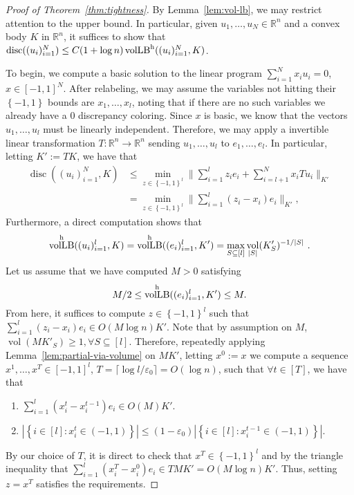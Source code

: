 \documentclass[11pt]{article}
\newcommand{\R}{{\mathbb{R}}}
\newcommand\eps{\varepsilon}
\newcommand{\set}[1]{\left\{ #1 \right\}}
\DeclareMathOperator{\vollb}{volLB}
\DeclareMathOperator{\disc}{disc}
\DeclareMathOperator{\vol}{vol}
\begin{document}
\begin{proof}[Proof of Theorem~\ref{thm:tightness}]
By Lemma~\ref{lem:vol-lb}, we may restrict attention to the upper bound. In
particular, given $u_1,\dots,u_N \in \R^n$ and a convex body $K$ in $\R^n$, it
suffices to show that $\disc((u_i)_{i=1}^N) \leq C(1+\log n)\vollb^{\rm
h}((u_i)_{i=1}^N,K)$.  

To begin, we compute a basic solution to the linear program $\sum_{i=1}^N x_i
u_i = 0$, $x \in [-1,1]^N$. After relabeling, we may assume the variables not
hitting their $\set{-1,1}$ bounds are $x_1,\dots,x_l$, noting that if there are
no such variables we already have a $0$ discrepancy coloring. Since
$x$ is basic, we know that the vectors $u_1,\dots,u_l$ must be linearly
independent. Therefore, we may apply a invertible linear
transformation $T:\R^n \rightarrow \R^n$ sending $u_1,\dots,u_l$ to
$e_1,\dots,e_l$. In particular, letting $K' := TK$, we have that 
\begin{align*}
\disc((u_i)_{i=1}^N,K) &\leq \min_{z \in \set{-1,1}^l} \|\sum_{i=1}^l z_i e_i +
\sum_{i=l+1}^N x_i T u_i\|_{K'} \\
                &= \min_{z \in \set{-1,1}^l} \|\sum_{i=1}^l (z_i-x_i)e_i\|_{K'}, 
\end{align*}
Furthermore, a direct computation shows that
\[
\vollb^{\rm h}((u_i)_{i=1}^l,K) = \vollb^{\rm h}((e_i)_{i=1}^l,K') = \max_{S \subseteq [l]}
\vol_{|S|}(K'_S)^{-1/|S|} \text{ .}
\] 
Let us assume that we have computed $M > 0$ satisfying 
\[
M/2 \leq \vollb^{\rm h}((e_i)_{i=1}^l,K') \leq M. 
\]
From here, it suffices to compute $z \in
\set{-1,1}^l$ such that $\sum_{i=1}^l (z_i-x_i) e_i \in O(M\log n) K'$. Note
that by assumption on $M$, $\vol(MK'_S) \geq 1, \forall S \subseteq [l]$.
Therefore, repeatedly applying Lemma~\ref{lem:partial-via-volume} on $MK'$, letting $x^0 := x$ we compute a sequence
$x^1,\dots,x^T \in [-1,1]^l$, $T = \lceil \log l/\eps_0
\rceil = O(\log n)$, such that $\forall t \in [T]$, we have that

\begin{enumerate}
\item $\sum_{i=1}^l (x^t_i-x^{t-1}_i)e_i \in O(M) K'$.
\item $|\set{i \in [l]: x^t_i \in (-1,1)}| \leq (1-\eps_0)|\set{i \in [l]:
x^{t-1}_i \in (-1,1)}|$.
\end{enumerate}

By our choice of $T$, it is direct to check that $x^T \in \set{-1,1}^l$ and by
the triangle inequality that $\sum_{i=1}^l (x^T_i-x^0_i)e_i \in T M K' = O(M\log n) K'$. Thus, setting $z = x^T$ satisfies the requirements.


\end{proof}
\end{document}
